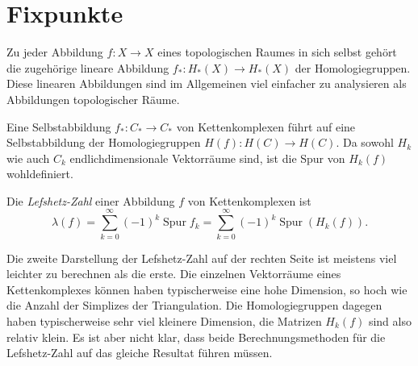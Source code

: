 %
%
%
\section{Fixpunkte
\label{buch:section:fixpunkte}}
Zu jeder Abbildung $f\colon X\to X$ eines topologischen Raumes in sich
selbst gehört die zugehörige lineare Abbildung $f_*\colon H_*(X)\to H_*(X)$
der Homologiegruppen.
Diese linearen Abbildungen sind im Allgemeinen viel einfacher zu
analysieren als Abbildungen topologischer Räume.

%


Eine Selbstabbildung $f_*\colon C_*\to C_*$ von Kettenkomplexen führt auf
eine Selbstabbildung der Homologiegruppen $H(f)\colon H(C)\to H(C)$.
Da sowohl $H_k$ wie auch $C_k$ endlichdimensionale Vektorräume sind, 
ist die Spur von $H_k(f)$ wohldefiniert.

\begin{definition}
Die {\em Lefshetz-Zahl} einer Abbildung $f$ von Kettenkomplexen ist
\begin{equation}
\lambda(f)
=
\sum_{k=0}^\infty
(-1)^k \operatorname{Spur}f_k
=
\sum_{k=0}^\infty 
(-1)^k \operatorname{Spur}(H_k(f)).
\label{buch:homologie:lefschetz-zahl}
\end{equation}
\end{definition}

Die zweite Darstellung  der Lefshetz-Zahl auf der rechten Seite ist
meistens viel leichter zu berechnen als die erste.
Die einzelnen Vektorräume eines Kettenkomplexes können haben typischerweise
eine hohe Dimension, so hoch wie die Anzahl der Simplizes der Triangulation.
Die Homologiegruppen dagegen haben typischerweise sehr viel kleinere 
Dimension, die Matrizen $H_k(f)$ sind also relativ klein.
Es ist aber nicht klar, dass beide Berechnungsmethoden für die 
Lefshetz-Zahl auf das gleiche Resultat führen müssen.

